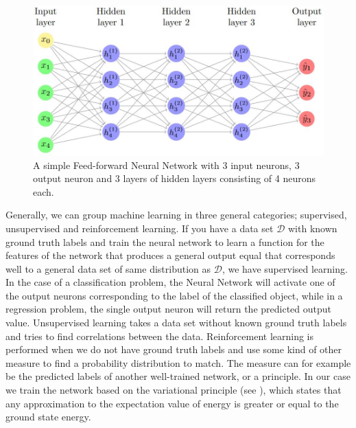 \begin{figure}[htbp]
  \centering
  \includegraphics[scale=0.5]{Images/DFFNN.JPG}
  \caption{A simple Feed-forward Neural Network with 3 input neurons, 3 output neuron and 3 layers of hidden layers consisting of 4 neurons each.}
  \label{fig:NN}
\end{figure}

Generally, we can group machine learning in three general categories; supervised, unsupervised and reinforcement learning. If you have a data set $\mathcal{D}$ with known ground truth labels and train the neural network to learn a function for the features of the network that produces a general output equal that corresponds well to a general data set of same distribution as $\mathcal{D}$, we have supervised learning. In the case of a classification problem, the Neural Network will activate one of the output neurons corresponding to the label of the classified object, while in a regression problem, the single output neuron will return the predicted output value. Unsupervised learning takes a data set without known ground truth labels and tries to find correlations between the data. Reinforcement learning is performed when we do not have ground truth labels and use some kind of other measure to find a probability distribution to match. The measure can for example be the predicted labels of another well-trained network, or a principle. In our case we train the network based on the variational principle (see \citep{project1}), which states that any approximation to the expectation value of energy is greater or equal to the ground state energy. 

